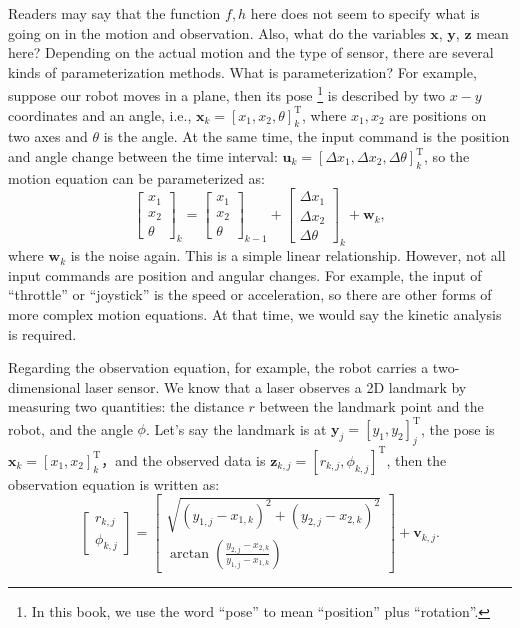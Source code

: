 Readers may say that the function $f,h$ here does not seem to specify what is going on in the motion and observation. Also, what do the variables $\mathbf{x}$, $\mathbf{y}$, $\mathbf{z}$ mean here? Depending on the actual motion and the type of sensor, there are several kinds of parameterization methods. What is parameterization? For example, suppose our robot moves in a plane, then its pose \footnote{ In this book, we use the word ``pose'' to mean ``position'' plus ``rotation''. } is described by two $x-y$ coordinates and an angle, i.e.,  $\mathbf{x}_k = [x_1,x_2,\theta]_k^\mathrm{T}$, where $x_1, x_2$ are positions on two axes and $\theta$ is the angle. At the same time, the input command is the position and angle change between the time interval: $\mathbf{u}_k = [ \Delta x_1, \Delta x_2, \Delta \theta ]_k^\mathrm{T} $, so the motion equation can be parameterized as:
\begin{equation}
{\left[ \begin{array}{l}
    x_1\\
    x_2\\
    \theta
    \end{array} \right]_k} = {\left[ \begin{array}{l}
    x_1\\
    x_2\\
    \theta
    \end{array} \right]_{k - 1}} + {\left[ \begin{array}{l}
    \Delta x_1\\
    \Delta x_2\\
    \Delta \theta
    \end{array} \right]_k} + {\mathbf{w}_k},
\end{equation}
where $\mathbf{w}_k$ is the noise again. This is a simple linear relationship. However, not all input commands are position and angular changes. For example, the input of ``throttle'' or ``joystick'' is the speed or acceleration, so there are other forms of more complex motion equations. At that time, we would say the kinetic analysis is required.

Regarding the observation equation, for example, the robot carries a two-dimensional laser sensor. We know that a laser observes a 2D landmark by measuring two quantities: the distance $r$ between the landmark point and the robot, and the angle $\phi$. Let's say the landmark is at $\mathbf{y}_j = [y_1, y_2]_j^\mathrm{T}$, the pose is $\mathbf{x}_k=[x_1,x_2]_k^\mathrm{T}$，and the observed data is $\mathbf{z}_{k,j} = [r_{k,j}, \phi_{k,j}]^\mathrm{T}$, then the observation equation is written as:
\begin{equation}
\left[ \begin{array}{l}
r_{k,j}\\
\phi_{k,j}
\end{array} \right] = \left[ \begin{array}{l}
\sqrt {{{\left(y_{1,j} - x_{1,k} \right)}^2} + {{\left( {{y_{2,j}} - x_{2,k} } \right)}^2}} \\
\arctan \left( \frac{{y_{2,j}} - x_{2,k}}{{y_{1,j} - x_{1,k}}} \right)
\end{array} \right] + \mathbf{v}_{k, j}.
\end{equation}

